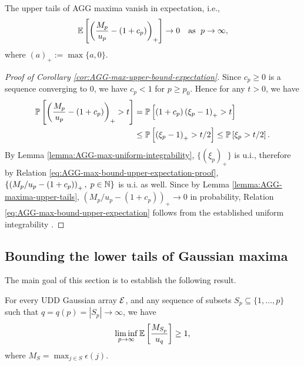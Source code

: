 \begin{corollary} \label{cor:AGG-max-upper-bound-expectation}
The upper tails of AGG maxima vanish in expectation, i.e.,
    \begin{equation} \label{eq:AGG-max-bound-upper-expectation}
    \E\left[\left(\frac{M_p}{u_p} - (1+c_p)\right)_+\right]
    \to 0 \quad\text{as }\; p\to\infty,
\end{equation}
where $(a)_+ := \max\{a,0\}$.
\end{corollary}

\begin{proof}[Proof of Corollary \ref{cor:AGG-max-upper-bound-expectation}]
Since $c_p\ge0$ is a sequence converging to 0, we have $c_p < 1$ for $p \ge p_0$. Hence for any $t>0$, we have
\begin{align}
    \P\left[\left(\frac{M_p}{u_p} - (1+c_p)\right)_+ > t\right] 
    &= \P\left[(1+c_p)\left(\xi_p-1\right)_+ > t\right] \nonumber \\
    &\le \P\left[\left(\xi_p-1\right)_+ > t/2\right] 
    \le \P\left[\xi_p > t/2 \right]. \label{eq:AGG-max-bound-upper-expectation-proof}
\end{align}
By Lemma \ref{lemma:AGG-max-uniform-integrability}, $\{\left(\xi_p\right)_+\}$ is u.i., therefore by Relation \eqref{eq:AGG-max-bound-upper-expectation-proof}, $\{\left(M_p/u_p - (1+c_p)\right)_+,\;p\in\N\}$ is u.i. as well.
Since by Lemma \ref{lemma:AGG-maxima-upper-tails}, $\left(M_p/u_p - (1+c_p)\right)_+\to 0$ in probability, Relation \eqref{eq:AGG-max-bound-upper-expectation} follows from the established uniform integrability \citep[see, e.g., Theorem 6.6.1 in][]{resnick:1999book}.
\end{proof}


\subsection{Bounding the lower tails of Gaussian maxima}
\label{subsec:bounding-lower-tails-of-maxima}

The main goal of this section is to establish the following result. 

\begin{proposition} \label{prop:Gaussian-maxima-expectation-lower-bound}
For every UDD Gaussian array $\cal E$, and any sequence of subsets
$S_p\subseteq\{1,\ldots,p\}$ such that $q = q(p) = |S_p|\to \infty$, we have
\begin{equation} \label{eq:AGG-max-bound-expectation}
    \liminf_{p\to\infty} \E\left[\frac{M_{S_p}}{u_q}\right] \ge 1,
\end{equation}
where $M_S = \max_{j\in S}\epsilon(j)$.
\end{proposition}

